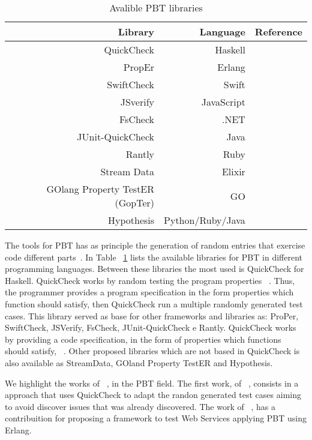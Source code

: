 	\begin{table}[ht]
		\begin{center}
		    \begin{tabular}{|r|r|r|}
		    \hline
		    \textbf{Library} & \textbf{Language} & \textbf{Reference} \\ \hline
		    QuickCheck & Haskell & ~\cite{quickcheck} \\ \hline
		    PropEr & Erlang & ~\cite{proper} \\ \hline
		    SwiftCheck & Swift & ~\cite{swiftcheck} \\ \hline
		    JSverify & JavaScript & ~\cite{jsverify} \\ \hline
		    FsCheck & .NET & ~\cite{fscheck} \\ \hline
		    JUnit-QuickCheck & Java & ~\cite{junit} \\ \hline
		    Rantly & Ruby & ~\cite{rantly} \\ \hline
		    Stream Data & Elixir & ~\cite{stream} \\ \hline
		    GOlang Property TestER (GopTer) & GO & ~\cite{gopter} \\ \hline
		    Hypothesis & Python/Ruby/Java & ~\cite{hyp} \\ \hline 
	    	\end{tabular}
		\end{center}
		\label{tab:libraries}
		\caption{Avalible PBT libraries}
	\end{table}

	The tools for PBT has as principle the generation of random entries that exercise code different parts~\cite{santos2018property}. In Table ~\ref{tab:libraries} lists the available libraries for PBT in different programming languages. Between these libraries the most used is QuickCheck for Haskell. QuickCheck works by random testing the program properties ~\cite{quickcheck}. Thus, the programmer provides a program specification in the form properties which function should satisfy, then QuickCheck run a multiple randomly generated test cases. This library served as base for other frameworks and libraries as: ProPer, SwiftCheck, JSVerify, FsCheck, JUnit-QuickCheck e Rantly. QuickCheck works by providing a code specification, in the form of properties which functions should satisfy,  ~\cite{quickcheck}. Other proposed libraries which are not based in QuickCheck is also available as StreamData, GOland Property TestER and Hypothesis. 

	We highlight the works of ~\cite{7809825, article}, in the PBT field. The first work, of ~\cite{7809825}, consists in a approach that uses QuickCheck to adapt the randon generated test cases aiming to avoid discover issues that was already discovered. The work of ~\cite{article}, has a contribuition for proposing a framework to test Web Services applying PBT using Erlang.